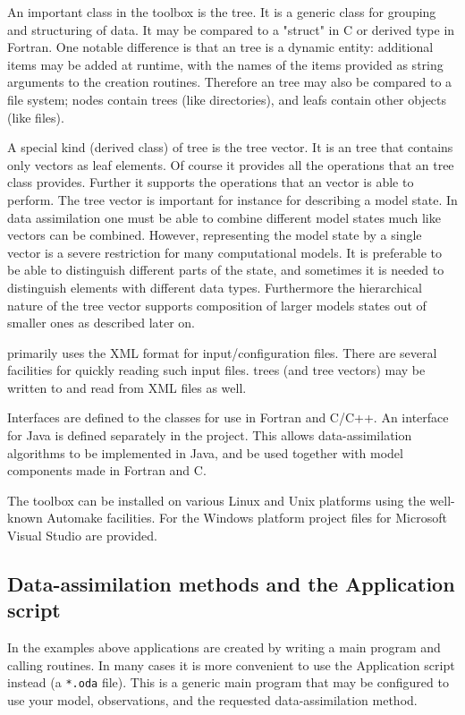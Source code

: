 An important class in the \oda toolbox is the \oda tree. It is a generic class for grouping and structuring of data. It may be compared to a "struct" in C or derived type in Fortran. One notable difference is that an \oda tree is a dynamic entity: additional items may be added at runtime, with the names of the items provided as string arguments to the creation routines. Therefore an \oda tree may also be compared to a file system; nodes contain \oda trees (like directories), and leafs contain other \oda objects (like files).

A special kind (derived class) of \oda tree is the \oda tree vector. It is an \oda tree that contains only \oda vectors as leaf elements. Of course it provides all the operations that an \oda tree class provides. Further it supports the operations that an \oda vector is able to perform. The \oda tree vector is important for instance for describing a model state. In data assimilation one must be able to combine different model states much like vectors can be combined. However, representing the model state by a single vector is a severe restriction for many computational models. It is preferable to be able to distinguish different parts of the state, and sometimes it is needed to distinguish elements with different data types. Furthermore the hierarchical nature of the \oda tree vector supports composition of larger models states out of smaller ones as described later on.

\oda primarily uses the XML format for input/configuration files. There are several facilities for quickly reading such input files. \oda trees (and tree vectors) may be written to and read from XML files as well.

Interfaces are defined to the \oda classes for use in Fortran and C/C++. An interface for Java is defined separately in the \oda project. This allows data-assimilation algorithms to be implemented in Java, and be used together with model components made in Fortran and C.

The \oda toolbox can be installed on various Linux and Unix platforms using the well-known Automake facilities. For the Windows platform project files for Microsoft Visual Studio are provided.

\subsection{Data-assimilation methods and the \oda Application script}

In the examples above \oda applications are created by writing a main program and calling \oda routines. In many cases it is more convenient to use the \oda Application script instead (a \verb|*.oda| file). This is a generic main program that may be configured to use your model, observations, and the requested data-assimilation method.


